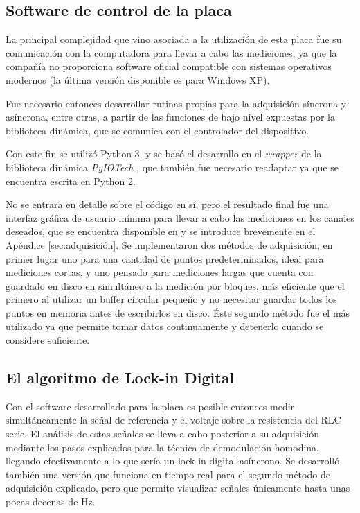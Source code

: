 \subsection{Software de control de la placa}
La principal complejidad que vino asociada a la utilización de esta placa fue su comunicación con la computadora para llevar a cabo las mediciones, ya que la compañía no proporciona software oficial compatible con sistemas operativos modernos (la última versión disponible es para Windows XP). 



Fue necesario entonces desarrollar rutinas propias para la adquisición síncrona y asíncrona, entre otras, a partir de las funciones de bajo nivel expuestas por la biblioteca dinámica, que se comunica con el controlador del dispositivo. %

Con  este fin se utilizó Python 3, y se basó el desarrollo en el \textit{wrapper} de la biblioteca dinámica \textit{PyIOTech} \cite{PyIOTech}, que también fue necesario readaptar ya que se encuentra escrita en Python 2. 

No se entrara en detalle sobre el código en sí, pero el resultado final fue una interfaz gráfica de usuario mínima para llevar a cabo las mediciones en los canales deseados, que se encuentra disponible en \cite{ignacioph21_2026_18828702} y se introduce brevemente en el Apéndice \ref{sec:adquisición}. Se implementaron dos métodos de adquisición, en primer lugar uno para una cantidad de puntos predeterminados, ideal para mediciones cortas, y uno pensado para mediciones largas que cuenta con guardado en disco en simultáneo a la medición por bloques, más eficiente que el primero al utilizar un buffer circular pequeño y no necesitar guardar todos los puntos en memoria antes de escribirlos en disco. Éste segundo método fue el más utilizado ya que permite tomar datos continuamente y detenerlo cuando se considere suficiente. 





\subsection{El algoritmo de Lock-in Digital} 
Con el software desarrollado para la placa es posible entonces medir simultáneamente la señal de referencia y el voltaje sobre la resistencia del RLC serie. El análisis de estas señales se lleva a cabo posterior a su adquisición mediante los pasos explicados para la técnica de demodulación homodina, llegando efectivamente a lo que sería un lock-in digital asíncrono. Se desarrolló también una versión que funciona en tiempo real para el segundo método de adquisición explicado, pero que permite visualizar señales únicamente hasta unas pocas decenas de Hz. %

